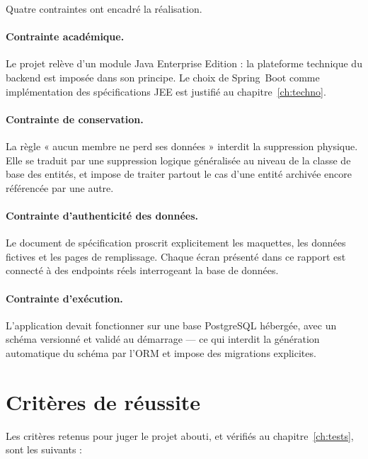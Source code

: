 Quatre contraintes ont encadré la réalisation.

\paragraph{Contrainte académique.} Le projet relève d'un module Java Enterprise Edition :
la plateforme technique du backend est imposée dans son principe. Le choix de Spring~Boot
comme implémentation des spécifications JEE est justifié au chapitre~\ref{ch:techno}.

\paragraph{Contrainte de conservation.} La règle « aucun membre ne perd ses données »
interdit la suppression physique. Elle se traduit par une suppression logique généralisée
au niveau de la classe de base des entités, et impose de traiter partout le cas d'une
entité archivée encore référencée par une autre.

\paragraph{Contrainte d'authenticité des données.} Le document de spécification proscrit
explicitement les maquettes, les données fictives et les pages de remplissage. Chaque
écran présenté dans ce rapport est connecté à des endpoints réels interrogeant la base de
données.

\paragraph{Contrainte d'exécution.} L'application devait fonctionner sur une base
PostgreSQL hébergée, avec un schéma versionné et validé au démarrage --- ce qui interdit
la génération automatique du schéma par l'ORM et impose des migrations explicites.

\section{Critères de réussite}

Les critères retenus pour juger le projet abouti, et vérifiés au chapitre~\ref{ch:tests},
sont les suivants :

